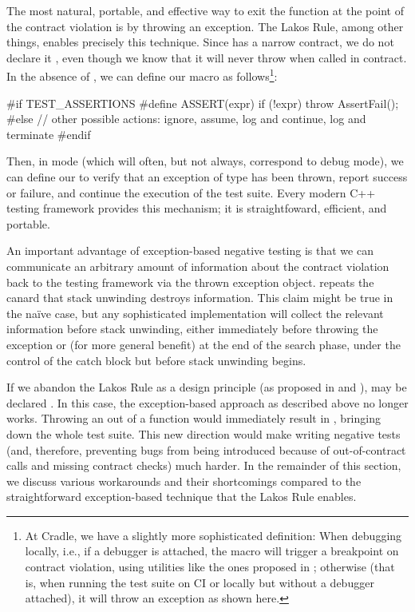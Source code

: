The most natural, portable, and effective way to exit the function at the point of the contract violation is by throwing an exception. The Lakos Rule, among other things, enables precisely this technique. Since  has a narrow contract, we do not declare it , even though we know that it will never throw when called in contract. In the absence of , we can define our  macro as follows\footnote{At Cradle, we have a slightly more sophisticated definition: When debugging locally, i.e., if a debugger is attached, the  macro will trigger a breakpoint on contract violation, using utilities like the ones proposed in \cite{P2514R0}; otherwise (that is, when running the test suite on CI or locally but without a debugger attached), it will throw an  exception as shown here.}:
\begin{codeblock}
#if TEST_ASSERTIONS
  #define ASSERT(expr) if (!expr) throw AssertFail();
#else
  // other possible actions: ignore, assume, log and continue, log and terminate
#endif
\end{codeblock}
Then, in  mode (which will often, but not always, correspond to debug mode), we can define our  to verify that an exception of type  has been thrown, report success or failure, and continue the execution of the test suite. Every modern C++ testing framework provides this mechanism; it is straightfoward, efficient, and portable.

An important advantage of exception-based negative testing is that we can communicate an arbitrary amount of information about the contract violation back to the testing framework via the thrown exception object. \cite{P1656R2} repeats the canard that stack unwinding destroys information. This claim might be true in the na\" ive case, but any sophisticated implementation will collect the relevant information before stack unwinding, either immediately before throwing the exception or (for more general benefit) at the end of the search phase, under the control of the catch block but before stack unwinding begins.

If we %
abandon the Lakos Rule as a design principle (as proposed in \cite{P1656R2} and \cite{P2148R0}),  may be declared . In this case, the exception-based approach as described above no longer works. Throwing an  out of a  function would immediately result in , bringing down the whole test suite. This new direction would make writing negative tests (and, therefore, preventing bugs from being introduced because of out-of-contract calls and missing contract checks) much harder. In the remainder of this section, we discuss various workarounds and their shortcomings compared to the straightforward exception-based technique that the Lakos Rule enables.

